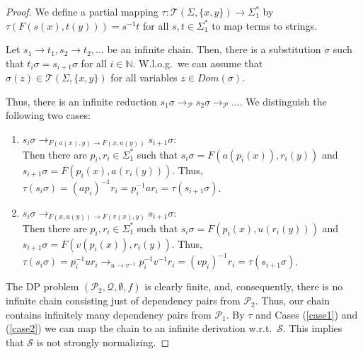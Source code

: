 \documentclass{article}
\renewcommand{\P}{\mathcal{P}}
\newcommand{\Q}{\mathcal{Q}}
\renewcommand{\S}{\mathcal{S}}
\newcommand{\T}{\mathcal{T}}
\newcommand{\N}{\mathbb{N}}
\begin{document}
\begin{proof}
We define a partial mapping $\tau : \T(\Sigma,\{x,y\}) \to \Sigma_{1}^{*}$ by $\tau(F(s(x),t(y))) = s^{-1}t$ for all $s,t \in \Sigma_{1}^{*}$ to map terms to strings.

Let $s_{1} \to t_{1}, s_{2} \to t_{2}, \ldots$ be an infinite chain. Then, there is a substitution
$\sigma$ such that $t_{i}\sigma = s_{i+1}\sigma$ for all $i \in \N$. W.l.o.g.\ we can assume
that $\sigma(z) \in \T(\Sigma,\{x,y\})$ for all variables $z \in Dom(\sigma)$.

Thus, there is an infinite reduction $s_{1}\sigma \to_{\P} s_{2}\sigma \to_{\P} \ldots$. We distinguish
the following two cases:
\begin{enumerate}
\item \label{case1}$s_{i}\sigma \to_{F(a(x),y) \to F(x,a(y))} s_{i+1}\sigma$:\\[2ex]
  Then there are $p_{i},r_{i} \in \Sigma_{1}^{*}$ such that $s_{i}\sigma = F(a(p_{i}(x)),r_{i}(y))$ and
  $s_{i+1}\sigma = F(p_{i}(x),a(r_{i}(y)))$. Thus, $\tau(s_{i}\sigma) = (ap_{i})^{-1}r_{i} = p_{i}^{-1}ar_{i} = \tau(s_{i+1}\sigma)$.
\item \label{case2}$s_{i}\sigma \to_{F(x,u(y)) \to F(v(x),y)} s_{i+1}\sigma$:\\[2ex]
  Then there are $p_{i},r_{i} \in \Sigma_{1}^{*}$ such that $s_{i}\sigma = F(p_{i}(x),u(r_{i}(y)))$ and
  $s_{i+1}\sigma = F(v(p_{i}(x)),r_{i}(y))$. Thus, $\tau(s_{i}\sigma) = p_{i}^{-1}ur_{i} \to_{u \to v^{-1}} p_{i}^{-1}v^{-1}r_{i} = (vp_{i})^{-1}r_{i} = \tau(s_{i+1}\sigma)$.
\end{enumerate}
The DP problem $(\P_{2}, \Q,\emptyset,f)$ is clearly finite, and, consequently, there is no
infinite chain consisting just of dependency pairs from $\P_{2}$. Thus, our chain contains infinitely many
dependency pairs from $\P_{1}$. By $\tau$ and Cases (\ref{case1}) and (\ref{case2}) we can
map the chain to an infinite derivation w.r.t.\ $\S$. This implies that $\S$ is not strongly normalizing.
\end{proof}
\end{document}
